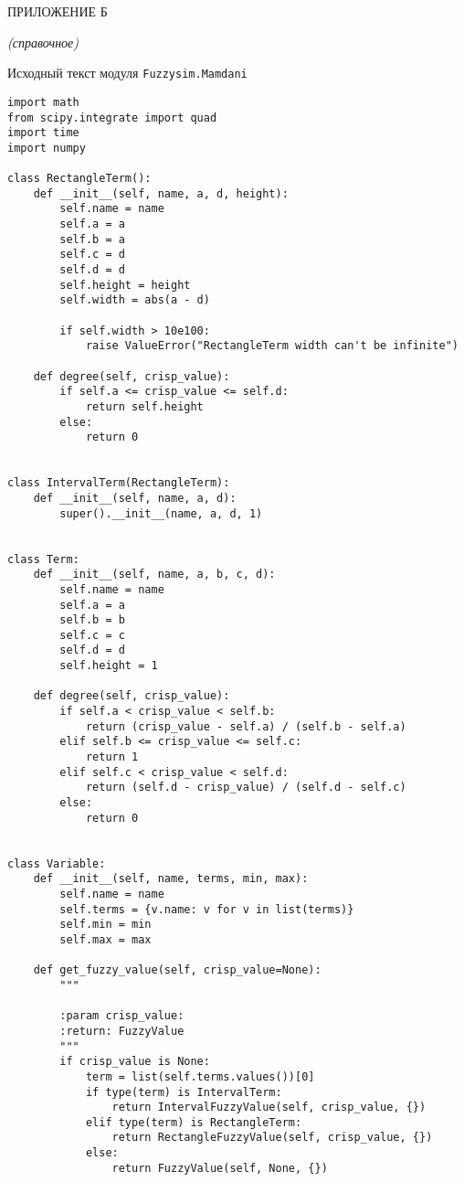 \lstset{style=pythoninlinestyle}

%

 \begin{center}
	ПРИЛОЖЕНИЕ Б
	
	\textit{(справочное)}
\end{center}


\begin{center}
	Исходный текст модуля \lstinline!Fuzzysim.Mamdani!
\end{center}



\begin{lstlisting}[style=pythonstyle,caption={ }, label=lst:func:1]
import math
from scipy.integrate import quad
import time
import numpy

class RectangleTerm():
	def __init__(self, name, a, d, height):
		self.name = name
		self.a = a
		self.b = a
		self.c = d
		self.d = d
		self.height = height
		self.width = abs(a - d)

		if self.width > 10e100:
			raise ValueError("RectangleTerm width can't be infinite")

	def degree(self, crisp_value):
		if self.a <= crisp_value <= self.d:
			return self.height
		else:
			return 0


class IntervalTerm(RectangleTerm):
	def __init__(self, name, a, d):
		super().__init__(name, a, d, 1)


class Term:
	def __init__(self, name, a, b, c, d):
		self.name = name
		self.a = a
		self.b = b
		self.c = c
		self.d = d
		self.height = 1

	def degree(self, crisp_value):
		if self.a < crisp_value < self.b:
			return (crisp_value - self.a) / (self.b - self.a)
		elif self.b <= crisp_value <= self.c:
			return 1
		elif self.c < crisp_value < self.d:
			return (self.d - crisp_value) / (self.d - self.c)
		else:
			return 0


class Variable:
	def __init__(self, name, terms, min, max):
		self.name = name
		self.terms = {v.name: v for v in list(terms)}
		self.min = min
		self.max = max

	def get_fuzzy_value(self, crisp_value=None):
		"""

		:param crisp_value:
		:return: FuzzyValue
		"""
		if crisp_value is None:
			term = list(self.terms.values())[0]
			if type(term) is IntervalTerm:
				return IntervalFuzzyValue(self, crisp_value, {})
			elif type(term) is RectangleTerm:
				return RectangleFuzzyValue(self, crisp_value, {})
			else:
				return FuzzyValue(self, None, {})


\end{lstlisting}
